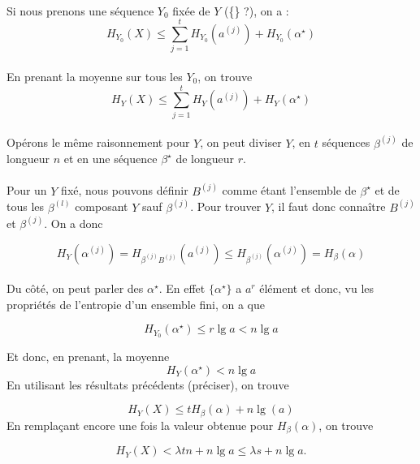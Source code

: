 	\paragraph{}
	Si nous prenons une séquence $Y_0$ fixée de $Y$ (\{\} ?), on a :
	\[
		H_{Y_0}(X)\le 
		\sum_{j=1}^tH_{Y_0}\left(a^{(j)}\right)+H_{Y_0}(\alpha^\star)
	\]
	
	\paragraph{}
	En prenant la moyenne sur tous les $Y_0$, on trouve
	\[H_Y(X)\le \sum_{j=1}^tH_Y\left(a^{(j)}\right)+H_Y(\alpha^\star)\]
	
	\paragraph{}
	Opérons le même raisonnement pour $Y$, on peut diviser $Y$, en $t$ 
	séquences $\beta^{(j)}$ de longueur $n$ et en une séquence ${\beta^\star}$
	de longueur $r$. 
	
	\paragraph{}
	Pour un $Y$ fixé, nous pouvons définir $B^{(j)}$ comme étant l'ensemble de
	$\beta^\star$ et de tous les $\beta^{(l)}$ composant $Y$ sauf 
	$\beta^{(j)}$. Pour trouver $Y$, il faut donc connaître $B^{(j)}$ 
	et $\beta^{(j)}$. On a 	donc
	
	\[
		H_Y(\alpha^{(j)}) = H_{\beta^{(j)}B^{(j)}}\left(a^{(j)}\right) \le 
		H_{\beta^{(j)}}\left(\alpha^{(j)}\right)=H_\beta(\alpha)
	\]
	
	\paragraph{}
	Du côté, on peut parler des $\alpha^\star$. En effet $\{\alpha^\star\}$ a 
	$a^r$ élément et donc, vu les propriétés de l'entropie d'un ensemble fini,
	on a que
	
	\[H_{Y_0}(\alpha^\star) \le r\lg a < n\lg a\]
	
	Et donc, en prenant, la moyenne 
	\[H_Y(\alpha^\star) < n \lg a\]
	En utilisant les résultats précédents (préciser), on trouve
	
	\[H_Y(X)\le t H_\beta(\alpha) + n \lg(a)\]
	En remplaçant encore une fois la valeur obtenue pour $H_\beta(\alpha)$, 
	on trouve
	
	\[H_Y(X)<\lambda t n + n \lg a \le \lambda s+n \lg a.\]
	
